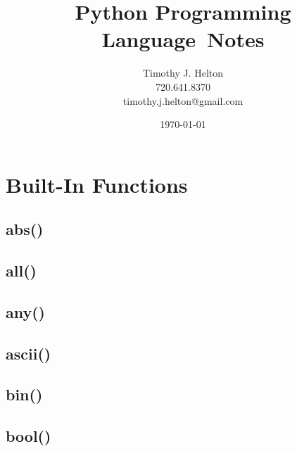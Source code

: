 \documentclass{article}
\newcommand{\topic}{Python Programming Language}
\begin{document}
\title{\topic \ Notes}
\author{Timothy J. Helton\\720.641.8370\\timothy.j.helton@gmail.com}
\date{\today}

\begin{titlingpage}
  \maketitle
\end{titlingpage}

\hypertarget{toc}{}
\tableofcontents
\newpage

\listoffigures
\listoftables
\newpage

\printnomenclature[0.75in]
\hfill

\newpage

\pagestyle{fancy}
\section{Built-In Functions}

\subsection{abs()}


\subsection{all()}


\subsection{any()}


\subsection{ascii()}


\subsection{bin()}


\subsection{bool()}
%
\end{document}
